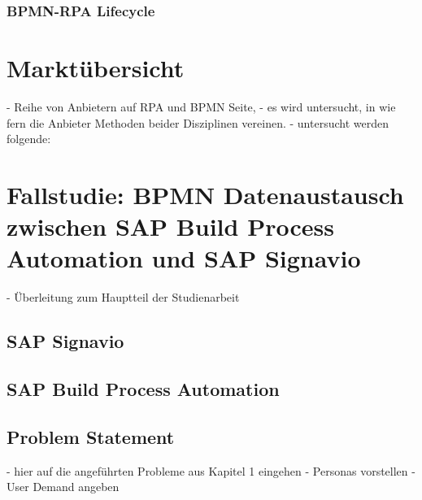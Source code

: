 \subsection{BPMN-RPA Lifecycle}
\chapter{Marktübersicht}
\begin{comment}
BPM market analysis
The BPM market was valued at $16 billion in 2023. Additionally, the market is projected to exceed $58 billion by the end of 2036, exhibiting 11 percent CAGR during the forecasted period. Some of the growth propelling factors for the market are:

A surge in focus on digitization of business processes.
The rapid adoption of BPM solutions for streamlining operations.
Increase in the adoption of cloud solutions.
The quest to raise the productivity of the business.
Furthermore, the market in the North America region is projected to reach almost 32 percent by the year 2036. The growth of the market can be attributed to the high penetration of advanced technologies among businesses. The presence of market leaders in the region is contributing to the significant development of various process modeling platforms. 
\end{comment}
- Reihe von Anbietern auf RPA und BPMN Seite,
- es wird untersucht, in wie fern die Anbieter Methoden beider Disziplinen vereinen.
- untersucht werden folgende:
\chapter{Fallstudie: BPMN Datenaustausch zwischen SAP Build Process Automation und SAP Signavio}

    - Überleitung zum Hauptteil der Studienarbeit
\section{SAP Signavio}
\section{SAP Build Process Automation}

\section{Problem Statement}
    - hier auf die angeführten Probleme aus Kapitel 1 eingehen
    - Personas vorstellen
    - User Demand angeben


